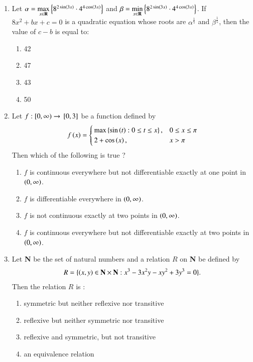 \documentclass[journal]{IEEEtran}
\begin{document}
\begin{enumerate}
\begin{enumerate}
    \item {}
    \item {}
    \item {}
    \item {}\\
\end{enumerate}
\item Let $\alpha = \max\limits_{x\in\textbf{R}}\left\{8^{2\sin\left(3x\right)} \cdot 4^{4\cos\left(3x\right)}\right\}$ and $\beta = \min\limits_{x\in\textbf{R}}\left\{8^{2\sin\left(3x\right)} \cdot 4^{4\cos\left(3x\right)}\right\}$. If $8x^2 + bx + c = 0$ is a quadratic equation whose roots are $\alpha^{\frac{1}{5}}$ and $\beta^{\frac{1}{5}}$, then the value of $c - b$ is equal to:
\begin{enumerate}
    \item 42
    \item 47
    \item 43
    \item 50\\
\end{enumerate}
\item Let $f: [0, \infty) \rightarrow {}\left[0, 3\right]$ be a function defined by 
\begin{align*}
f\left(x\right) =
    \begin{cases}
    \max\left\{\sin\left(t\right):0 \leq t \leq x \right\}, & 0 \leq x \leq \pi \\
    2 + \cos\left(x\right), & x > \pi
    \end{cases}
\end{align*}
Then which of the following is true ?
\begin{enumerate}
    \item $f$ is continuous everywhere but not differentiable exactly at one point in $\left(0, \infty\right)$.
    \item $f$ is differentiable everywhere in $\left(0, \infty\right)$.
    \item $f$ is not continuous exactly at two points in $\left(0, \infty\right)$.
    \item $f$ is continuous everywhere but not differentiable exactly at two points in $\left(0, \infty\right)$.\\
\end{enumerate}
\item Let \textbf{N} be the set of natural numbers and a relation $R$ on \textbf{N} be defined by 
\begin{align*}
 R = \{ \left(x, y\right) \in \textbf{N} \times \textbf{N}: x^3 - 3x^2y - xy^2 + 3y^3 = 0 \}.
\end{align*}
Then the relation $R$ is :
\begin{enumerate}
    \item symmetric but neither reflexive nor transitive
    \item reflexive but neither symmetric nor transitive
    \item reflexive and symmetric, but not transitive
    \item an equivalence relation\\
\end{enumerate}
			 \end{enumerate}
			 
\end{document}
